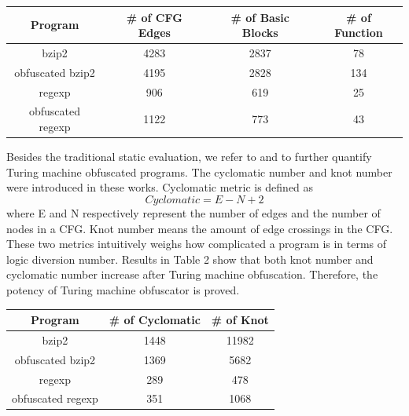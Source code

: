 \documentclass[lnicst]{svmultln}
\begin{document}
\begin{center}
 
 \begin{tabular}{|c | c | c | c|}
 \hline 
 Program & \# of CFG Edges & \# of Basic Blocks & \# of Function \\
 \hline
bzip2 & 4283 & 2837 & 78 \\ 
 \hline
obfuscated bzip2 & 4195 & 2828 & 134 \\
 \hline
regexp & 906 & 619 & 25 \\ 
 \hline
obfuscated regexp & 1122 & 773 & 43 \\
 \hline
\end{tabular}
\end{center}

Besides the traditional static evaluation, we refer to \cite{McCabe} and \cite{Woodward} to further quantify Turing machine obfuscated programs. The cyclomatic number and knot number were introduced in these works. Cyclomatic metric is defined as \[ Cyclomatic = E - N + 2 \] where E and N respectively represent the number of edges and the number of nodes in a CFG. Knot number means the amount of edge crossings in the CFG. These two metrics intuitively weighs how complicated a program is in terms of logic diversion number. Results in Table 2 show that both knot number and cyclomatic number increase after Turing machine obfuscation. Therefore, the potency of Turing machine obfuscator is proved.

\begin{center}
 \begin{tabular}{|c | c | c |} 
 \hline 
 Program & \# of Cyclomatic & \# of Knot \\
 \hline
bzip2 & 1448 & 11982  \\ 
 \hline
obfuscated bzip2 & 1369 & 5682  \\
 \hline
regexp & 289 & 478 \\ 
 \hline
obfuscated regexp & 351 & 1068 \\
 \hline
\end{tabular}
\end{center}
\end{document}
